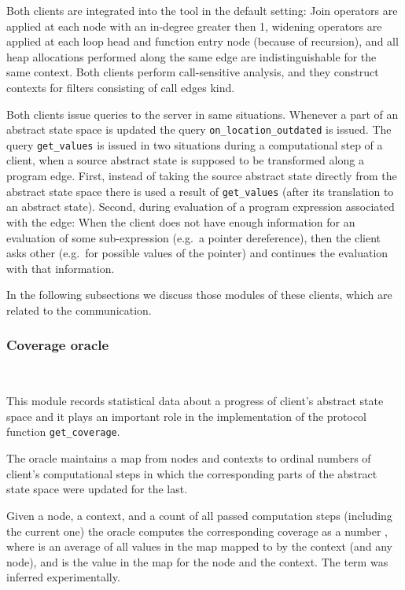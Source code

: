 \documentclass[envcountsame]{llncs}
\begin{document}
Both clients are integrated into the tool in the default setting: Join operators
are applied at each node with an in-degree greater then 1, widening operators
are applied at each loop head and function entry node (because of recursion),
and all heap allocations performed along the same edge are indistinguishable for
the same context. Both clients perform call-sensitive analysis, and they
construct contexts for filters consisting of call edges kind.

Both clients issue queries to the server in same situations. Whenever a part of
an abstract state space is updated the query \texttt{on\_location\_outdated} is
issued. The query \texttt{get\_values} is issued in two situations during a
computational step of a client, when a source abstract state is supposed to be
transformed along a program edge. First, instead of taking the source abstract
state directly from the abstract state space there is used a result of
\texttt{get\_values} (after its translation to an abstract state). Second,
during evaluation of a program expression associated with the edge: When the
client does not have enough information for an evaluation of some sub-expression
(e.g.~a pointer dereference), then the client asks other (e.g.~for possible
values of the pointer) and continues the evaluation with that information.

In the following subsections we discuss those modules of these clients, which
are related to the communication.

\subsubsection{Coverage oracle}~\\
\label{sec:CoverageSracleBoxPolka}

This module records statistical data about a progress of client's abstract state
space and it plays an important role in the implementation of the protocol
function \texttt{get\_coverage}.

The oracle maintains a map from nodes and contexts to ordinal numbers of
client's computational steps in which the corresponding parts of the abstract
state space were updated for the last.

Given a node, a context, and a count  of all passed computation steps
(including the current one) the oracle computes the corresponding coverage as a
number , where  is an average of all
values in the map mapped to by the context (and any node), and  is the
value in the map for the node and the context. The term was inferred
experimentally.
\end{document}
